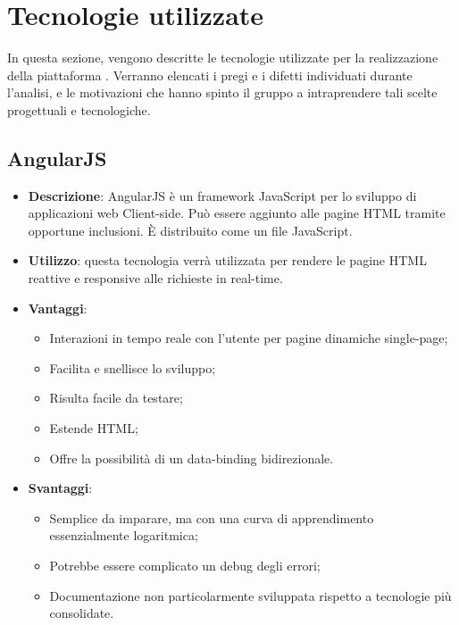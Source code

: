 \newpage
\section{Tecnologie utilizzate}
In questa sezione, vengono descritte le tecnologie utilizzate per la realizzazione della piattaforma \progetto. Verranno elencati i pregi e i difetti individuati durante l'analisi, e le motivazioni che hanno spinto il gruppo \textit{\gruppo} a intraprendere tali scelte progettuali e tecnologiche.

\subsection{AngularJS}
\begin{itemize}
	\item \textbf{Descrizione}: AngularJS è un framework JavaScript per lo sviluppo di applicazioni web Client-side. Può essere aggiunto alle pagine HTML tramite opportune inclusioni. \MakeUppercase{è} distribuito come un file JavaScript.
	\item \textbf{Utilizzo}: questa tecnologia verrà utilizzata per rendere le pagine HTML reattive e responsive alle richieste in real-time.
	\item \textbf{Vantaggi}: 
	\begin{itemize}
		\item Interazioni in tempo reale con l'utente per pagine dinamiche single-page;
		\item Facilita e snellisce lo sviluppo;
		\item Risulta facile da testare;
		\item Estende HTML;
		\item Offre la possibilità di un data-binding bidirezionale.
	\end{itemize}
	\item \textbf{Svantaggi}:
	\begin{itemize}
		\item Semplice da imparare, ma con una curva di apprendimento essenzialmente logaritmica;
		\item Potrebbe essere complicato un debug degli errori;
		\item Documentazione non particolarmente sviluppata rispetto a tecnologie più consolidate.
	\end{itemize}
\end{itemize}


